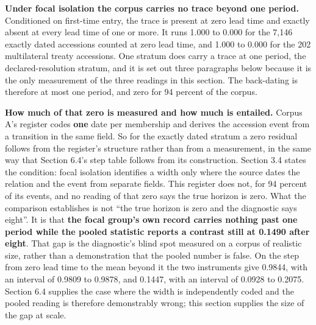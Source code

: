 \documentclass[twoside,11pt]{article}
\begin{document}
\textbf{Under focal isolation the corpus carries no trace beyond one period.} Conditioned on first-time entry, the trace is present at zero lead time and exactly absent at every lead time of one or more. It runs 1.000 to 0.000 for the 7,146 exactly dated accessions counted at zero lead time, and 1.000 to 0.000 for the 202 multilateral treaty accessions. One stratum does carry a trace at one period, the declared-resolution stratum, and it is set out three paragraphs below because it is the only measurement of the three readings in this section. The back-dating is therefore at most one period, and zero for 94 percent of the corpus.

\textbf{How much of that zero is measured and how much is entailed.} Corpus A's register codes \textbf{one} date per membership and derives the accession event from a transition in the same field. So for the exactly dated stratum a zero residual follows from the register's structure rather than from a measurement, in the same way that Section 6.4's step table follows from its construction. Section 3.4 states the condition: focal isolation identifies a width only where the source dates the relation and the event from separate fields. This register does not, for 94 percent of its events, and no reading of that zero says the true horizon is zero. What the comparison establishes is not ``the true horizon is zero and the diagnostic says eight''. It is that \textbf{the focal group's own record carries nothing past one period while the pooled statistic reports a contrast still at 0.1490 after eight}. That gap is the diagnostic's blind spot measured on a corpus of realistic size, rather than a demonstration that the pooled number is false. On the step from zero lead time to the mean beyond it the two instruments give 0.9844, with an interval of 0.9809 to 0.9878, and 0.1447, with an interval of 0.0928 to 0.2075. Section 6.4 supplies the case where the width is independently coded and the pooled reading is therefore demonstrably wrong; this section supplies the size of the gap at scale.
\end{document}

